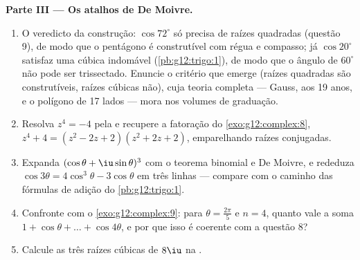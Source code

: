 \begin{problem}
\medskip
\noindent\textbf{Parte III --- Os atalhos de De Moivre.}
\begin{enumerate}[resume]
  \item O veredicto da construção: $\cos 72^\circ$ só precisa de
        raízes quadradas (questão 9), de modo que o pentágono é
        construtível com régua e compasso; já $\cos 20^\circ$
        satisfaz uma cúbica indomável
        (\cref{pb:g12:trigo:1}), de modo que o ângulo de
        $60^\circ$ não pode ser trissectado. Enuncie o critério
        que emerge (raízes quadradas são construtíveis, raízes
        cúbicas não), cuja teoria completa --- Gauss, aos 19
        anos, e o polígono de 17 lados --- mora nos volumes de
        graduação.
  \item Resolva $z^4 = -4$ pela  e recupere a
        fatoração do \cref{exo:g12:complex:8},
        $z^4 + 4 = (z^2 - 2z + 2)(z^2 + 2z + 2)$, emparelhando
        raízes conjugadas.
  \item Expanda $(\cos\theta + \iu\sin\theta)^3$ com o teorema
        binomial e De Moivre, e rededuza
        $\cos 3\theta = 4\cos^3\theta - 3\cos\theta$ em três
        linhas --- compare com o caminho das fórmulas de adição
        do \cref{pb:g12:trigo:1}.
  \item Confronte com o \cref{exo:g12:complex:9}: para
        $\theta = \frac{2\pi}{5}$ e $n = 4$, quanto vale a soma
        $1 + \cos\theta + \dots + \cos 4\theta$, e por que isso é
        coerente com a questão 8?
  \item Calcule as três raízes cúbicas de $8\iu$ na .
\end{enumerate}


\end{problem}
